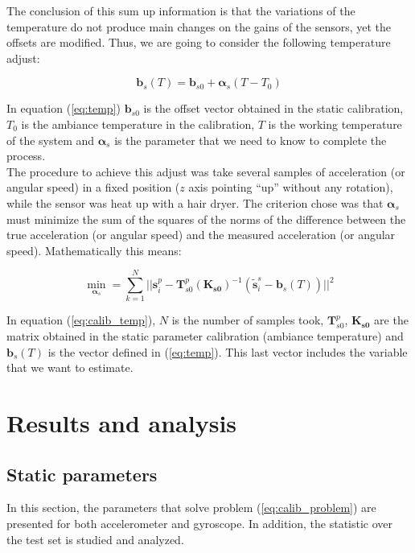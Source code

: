 \documentclass[conference]{IEEEtran}
\newcommand{\refp}[1]{(\ref{#1})}
\begin{document}
The conclusion of this sum up information is that the variations of the temperature do not produce main changes on the gains of the sensors, yet the offsets are modified. Thus, we are going to consider the following temperature adjust:

\begin{equation}
\mathbf{b}_s(T) = \mathbf{b}_{s0} + \boldsymbol{\alpha}_s (T-T_0)
\label{eq:temp}
\end{equation}

In equation \refp{eq:temp} $\mathbf{b}_{s0}$ is the offset vector obtained in the static calibration, $T_0$ is the ambiance temperature in the calibration, $T$ is the working temperature of the system and $\boldsymbol{\alpha}_s$ is the parameter that we need to know to complete the process.\\ 

The procedure to achieve this adjust was take several samples of acceleration (or angular speed) in a fixed position ($z$ axis pointing ``up'' without any rotation), while the sensor was heat up with a hair dryer. The criterion chose was that $\boldsymbol{\alpha}_s$ must minimize the sum of the squares of the norms of the difference between the true acceleration (or angular speed) and the measured acceleration (or angular speed). Mathematically this means:

\begin{equation}
\min_{\boldsymbol{\alpha}_s} = \sum_{k=1}^N ||\mathbf{s}_i^p - \mathbf{T}_{s0}^p(\mathbf{K_{s0}})^{-1}(\tilde{\mathbf{s}}_i^s-\mathbf{b}_s(T))||^2 
\label{eq:calib_temp}
\end{equation}

In equation \refp{eq:calib_temp}, $N$ is the number of samples took, $\mathbf{T}_{s0}^p$, $\mathbf{K_{s0}}$ are the matrix obtained in the static parameter calibration (ambiance temperature) and $\mathbf{b}_s(T)$ is the vector defined in \refp{eq:temp}. This last vector includes the variable that we want to estimate.\\

\section{Results and analysis}
\subsection{Static parameters}
In this section, the parameters that solve problem \refp{eq:calib_problem} are presented for both accelerometer and gyroscope. In addition, the statistic over the test set is studied and analyzed. 
\end{document}
